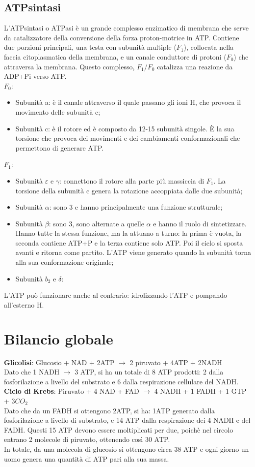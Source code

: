 \subsection{ATPsintasi}
L'ATPsintasi o ATPasi \`e un grande complesso enzimatico di membrana che serve da catalizzatore della conversione della forza proton-motrice in ATP. Contiene due porzioni principali, una testa con subunit\`a multiple ($F_1$), collocata nella faccia citoplasmatica della membrana, e un canale conduttore di protoni ($F_0$) che attraversa la membrana. Questo complesso, $F_1$/$F_0$ catalizza una reazione da ADP+Pi verso ATP.
\\$F_0$:
\begin{itemize}
    \item Subunit\`a a: \`e il canale attraverso il quale passano gli ioni H\ap{+}, che provoca il movimento delle subunit\`a c;
    \item Subunit\`a c: \`e il rotore ed \`e composto da 12-15 subunit\`a singole. \`E la sua torsione che provoca dei movimenti e dei cambiamenti conformazionali che permettono di generare ATP.
\end{itemize}
$F_1$:
\begin{itemize}
    \item Subunit\`a $\varepsilon$ e $\gamma$: connettono il rotore alla parte pi\`u massiccia di $F_1$. La torsione della subunit\`a c genera la rotazione accoppiata dalle due subunit\`a;
    \item Subunit\`a $\alpha$: sono 3 e hanno principalmente una funzione strutturale;
    \item Subunit\`a $\beta$: sono 3, sono alternate a quelle $\alpha$ e hanno il ruolo di sintetizzare. Hanno tutte la stessa funzione, ma la attuano a turno: la prima \`e vuota, la seconda contiene ATP+P e la terza contiene solo ATP. Poi il ciclo si sposta avanti e ritorna come partito. L'ATP viene generato quando la subunit\`a torna alla sua conformazione originale;
    \item Subunit\`a $b_2$ e $\delta$: 
\end{itemize}
L'ATP pu\`o funzionare anche al contrario: idrolizzando l'ATP e pompando all'esterno H\ap{+}.
\section{Bilancio globale}
\textbf{Glicolisi}: Glucosio + NAD\ap{+} + 2ATP $\xrightarrow{}$ 2 piruvato + 4ATP + 2NADH
\\Dato che 1 NADH $\xrightarrow{}$ 3 ATP, si ha un totale di 8 ATP prodotti: 2 dalla fosforilazione a livello del substrato e 6 dalla respirazione cellulare del NADH.
\\\textbf{Ciclo di Krebs}: Piruvato + 4 NAD\ap{+} + FAD $\xrightarrow{}$ 4 NADH + 1 FADH + 1 GTP + $3CO_2$
\\Dato che da un FADH si ottengono 2ATP, si ha: 1ATP generato dalla fosforilazione a livello di substrato, e 14 ATP dalla respirazione dei 4 NADH e del FADH. Questi 15 ATP devono essere moltiplicati per due, poich\`e nel circolo entrano 2 molecole di piruvato, ottenendo cos\`i 30 ATP.
\\In totale, da una molecola di glucosio si ottengono circa 38 ATP e ogni giorno un uomo genera una quantit\`a di ATP pari alla sua massa.
